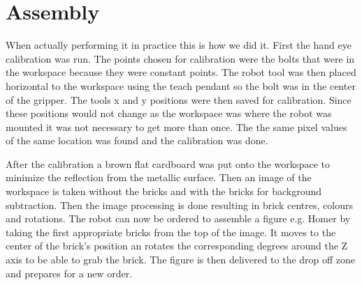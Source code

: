 \chapter{Assembly}
When actually performing it in practice this is how we did it. First the hand eye calibration was run. The points chosen for calibration were the bolts that were in the workspace because they were constant points. The robot tool was then placed horizontal to the workspace using the teach pendant so the bolt was in the center of the gripper. The tools x and y positions were then saved for calibration. Since these positions would not change as the workspace was where the robot was mounted it was not necessary to get more than once. The the same pixel values of the same location was found and the calibration was done.  

After the calibration a brown flat cardboard was put onto the workspace to minimize the reflection from the metallic surface. Then an image of the workspace is taken without the bricks and with the bricks for background subtraction. Then the image processing is done resulting in brick centres, colours and rotations. The robot can now be ordered to assemble a figure e.g. Homer by taking the first appropriate bricks from the top of the image. It moves to the center of the brick's position an rotates the corresponding degrees around the Z axis to be able to grab the brick.  The figure is then delivered to the drop off zone and prepares for a new order. 